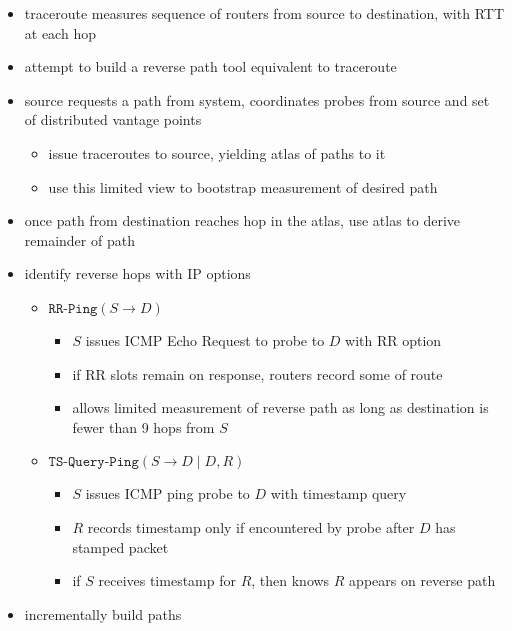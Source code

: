 \begin{itemize}
    \item traceroute measures sequence of routers from source to destination,
    with RTT at each hop
    \item attempt to build a reverse path tool equivalent to traceroute
    \item source requests a path from system, coordinates probes from source and
    set of distributed vantage points
    \begin{itemize}
        \item issue traceroutes to source, yielding atlas of paths to it
        \item use this limited view to bootstrap measurement of desired path
    \end{itemize}
    \item once path from destination reaches hop in the atlas, use atlas to
    derive remainder of path
    \item identify reverse hops with IP options
    \begin{itemize}
        \item $\texttt{RR-Ping}(S\to D)$
        \begin{itemize}
            \item $S$ issues ICMP Echo Request to probe to $D$ with RR option
            \item if RR slots remain on response, routers record some of route
            \item allows limited measurement of reverse path as long as
            destination is fewer than 9 hops from $S$
        \end{itemize}
        \item $\texttt{TS-Query-Ping}(S\to D\mid D, R)$
        \begin{itemize}
            \item $S$ issues ICMP ping probe to $D$ with timestamp query
            \item $R$ records timestamp only if encountered by probe after $D$
            has stamped packet
            \item if $S$ receives timestamp for $R$, then knows $R$ appears on
            reverse path
        \end{itemize}
    \end{itemize}
    \item incrementally build paths
\end{itemize}